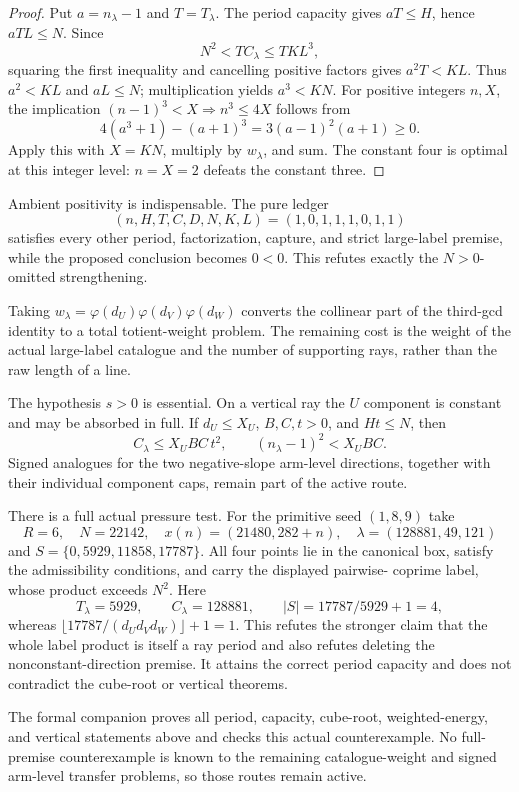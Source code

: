 \begin{proof}
Put $a=n_\lambda-1$ and $T=T_\lambda$.  The period capacity gives
$aT\le H$, hence $aTL\le N$.  Since
\[
 N^2<TC_\lambda\le TKL^3,
\]
squaring the first inequality and cancelling positive factors gives
$a^2T<KL$.  Thus $a^2<KL$ and $aL\le N$; multiplication yields
$a^3<KN$.  For positive integers $n,X$, the implication
$(n-1)^3<X\Rightarrow n^3\le4X$ follows from
\[
 4(a^3+1)-(a+1)^3=3(a-1)^2(a+1)\ge0.
\]
Apply this with $X=KN$, multiply by $w_\lambda$, and sum.  The constant four
is optimal at this integer level: $n=X=2$ defeats the constant three.
\end{proof}

Ambient positivity is indispensable.  The pure ledger
\[
             (n,H,T,C,D,N,K,L)=(1,0,1,1,1,0,1,1)
\]
satisfies every other period,
factorization, capture, and strict large-label premise, while the proposed
conclusion becomes $0<0$.  This refutes exactly the $N>0$-omitted
strengthening.

Taking
$w_\lambda=\varphi(d_U)\varphi(d_V)\varphi(d_W)$ converts the collinear part
of the third-gcd identity to a total totient-weight problem.  The remaining
cost is the weight of the actual large-label catalogue and the number of
supporting rays, rather than the raw length of a line.

The hypothesis $s>0$ is essential.  On a vertical ray the $U$ component is
constant and may be absorbed in full.  If $d_U\le X_U$, $B,C,t>0$, and
$Ht\le N$, then
\[
 C_\lambda\le X_UBC\,t^2,\qquad
 (n_\lambda-1)^2<X_UBC.
\]
Signed analogues for the two negative-slope arm-level directions, together
with their individual component caps, remain part of the active route.

There is a full actual pressure test.  For the primitive seed $(1,8,9)$ take
\[
 R=6,\quad N=22142,\quad x(n)=(21480,282+n),
 \quad\lambda=(128881,49,121)
\]
and $S=\{0,5929,11858,17787\}$.  All four points lie in the canonical box,
satisfy the admissibility conditions, and carry the displayed pairwise-
coprime label, whose product exceeds $N^2$.  Here
\[
 T_\lambda=5929,\qquad C_\lambda=128881,\qquad
 |S|=17787/5929+1=4,
\]
whereas $\lfloor17787/(d_Ud_Vd_W)\rfloor+1=1$.  This refutes the stronger
claim that the whole label product is itself a ray period and also refutes
deleting the nonconstant-direction premise.  It attains the correct period
capacity and does not contradict the cube-root or vertical theorems.

The formal companion proves all period, capacity, cube-root, weighted-energy,
and vertical statements above and checks this actual counterexample.  No
full-premise counterexample is known to the remaining catalogue-weight and
signed arm-level transfer problems, so those routes remain active.
